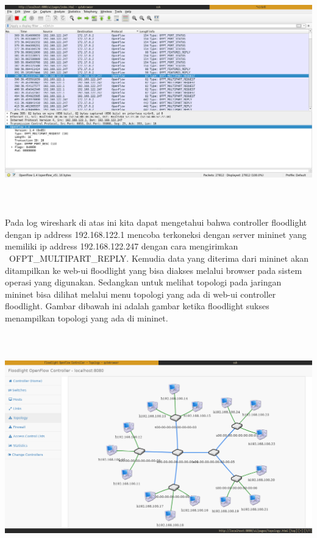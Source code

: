 \begin{center}
\includegraphics[width=6.9252in,height=3.8929in]{gambar/wireshark.png}
\end{center}

Pada log wireshark di atas ini kita dapat mengetahui bahwa controller floodlight dengan ip address 192.168.122.1
mencoba terkoneksi dengan server mininet yang memiliki ip address 192.168.122.247 dengan cara mengirimkan
\ OFPT\_MULTIPART\_REPLY. Kemudia data yang diterima dari mininet akan ditampilkan ke web-ui floodlight yang bisa
diakses melalui browser pada sistem operasi yang digunakan. Sedangkan untuk melihat topologi pada jaringan mininet bisa
dilihat melalui menu topologi yang ada di web-ui controller floodlight. Gambar dibawah ini adalah gambar ketika
floodlight sukses menampilkan topologi yang ada di mininet.
\begin{center}
\includegraphics[width=6.9252in,height=3.8929in]{gambar/fltopo.png}
\end{center}
